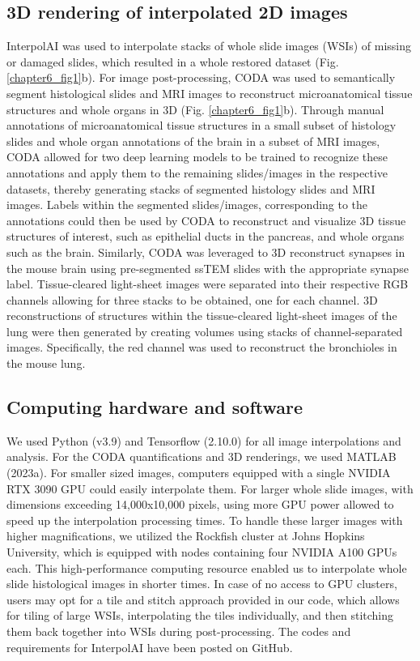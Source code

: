 \begin{refsection}
    \subsection{3D rendering of interpolated 2D images}
    InterpolAI was used to interpolate stacks of whole slide images (WSIs) of missing or damaged slides, which resulted in a whole restored dataset (Fig. \ref{chapter6_fig1}b). For image post-processing, CODA was used to semantically segment histological slides and MRI images to reconstruct microanatomical tissue structures and whole organs in 3D (Fig. \ref{chapter6_fig1}b). Through manual annotations of microanatomical tissue structures in a small subset of histology slides and whole organ annotations of the brain in a subset of MRI images, CODA allowed for two deep learning models to be trained to recognize these annotations and apply them to the remaining slides/images in the respective datasets, thereby generating stacks of segmented histology slides and MRI images. Labels within the segmented slides/images, corresponding to the annotations could then be used by CODA to reconstruct and visualize 3D tissue structures of interest, such as epithelial ducts in the pancreas, and whole organs such as the brain. Similarly, CODA was leveraged to 3D reconstruct synapses in the mouse brain using pre-segmented ssTEM slides with the appropriate synapse label. Tissue-cleared light-sheet images were separated into their respective RGB channels allowing for three stacks to be obtained, one for each channel. 3D reconstructions of structures within the tissue-cleared light-sheet images of the lung were then generated by creating volumes using stacks of channel-separated images. Specifically, the red channel was used to reconstruct the bronchioles in the mouse lung.
    
    \subsection{Computing hardware and software}
    We used Python (v3.9) and Tensorflow (2.10.0) for all image interpolations and analysis. For the CODA quantifications and 3D renderings, we used MATLAB (2023a).
    For smaller sized images, computers equipped with a single NVIDIA RTX 3090 GPU could easily interpolate them. For larger whole slide images, with dimensions exceeding 14,000x10,000 pixels, using more GPU power allowed to speed up the interpolation processing times. To handle these larger images with higher magnifications, we utilized the Rockfish cluster at Johns Hopkins University, which is equipped with nodes containing four NVIDIA A100 GPUs each. This high-performance computing resource enabled us to interpolate whole slide histological images in shorter times. In case of no access to GPU clusters, users may opt for a tile and stitch approach provided in our code, which allows for tiling of large WSIs, interpolating the tiles individually, and then stitching them back together into WSIs during post-processing. The codes and requirements for InterpolAI have been posted on GitHub.  
    
    \clearpage
    \printbibliography[heading=subbibliography, title={References}]
\end{refsection}